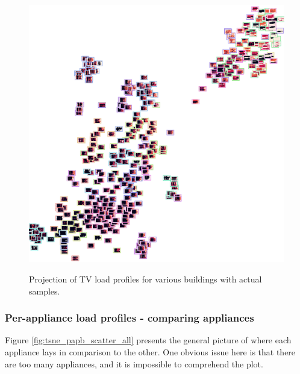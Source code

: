 \begin{figure}[H]
	\centering
	\caption{Projection of TV load profiles for various buildings with actual samples.}
	\includegraphics[width=.9\textwidth]{Figures/TSNE/TSNE_per_appliance/all/img_scatter_alltelevision.png}
	\label{fig:tsne_pa_img_scatter_all_tv}
\end{figure}

\subsubsection{Per-appliance load profiles - comparing appliances}

Figure \ref{fig:tsne_papb_scatter_all} presents the general picture of where each appliance lays in comparison to the other.
One obvious issue here is that there are too many appliances, and it is impossible to comprehend the plot.

